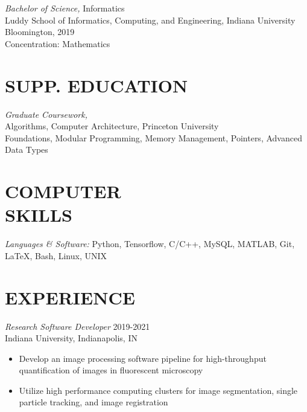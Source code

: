 \documentclass[margin, 10pt]{res} %
\begin{document}
\begin{resume}
{\sl Bachelor of Science,} Informatics \\
Luddy School of Informatics, Computing, and Engineering, Indiana University Bloomington, 2019\\
Concentration: Mathematics 
 
\section{SUPP. EDUCATION} 

{\sl Graduate Coursework,} \\
Algorithms, Computer Architecture, Princeton University\\
Foundations, Modular Programming, Memory Management, Pointers, Advanced Data Types



\section{COMPUTER \\ SKILLS} 

{\sl Languages \& Software:} 
Python, Tensorflow, C/C++, MySQL, MATLAB, Git, LaTeX, Bash, Linux, UNIX\\
 
 
\section{EXPERIENCE}

{\sl Research Software Developer} \hfill 2019-2021 \\
Indiana University, Indianapolis, IN

\begin{itemize} \itemsep -2pt %

\item Develop an image processing software pipeline for high-throughput quantification of images in fluorescent microscopy

\item Utilize high performance computing clusters for image segmentation, single particle tracking, and image registration
 

\end{itemize}
\end{resume}
\end{document}
